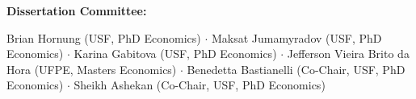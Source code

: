 \documentclass[mm, 10pt]{simple_style}
\begin{document}
\begin{resume}
\begin{minipage}[t]{0.75\textwidth}
\end{minipage}

\textbf{Dissertation Committee:} \\
\indent \hspace{1cm}  \begin{minipage}[t]{0.75\textwidth}
        Brian Hornung (USF, PhD Economics)
        $\cdot$ Maksat Jumamyradov (USF, PhD Economics)
        $\cdot$ Karina Gabitova (USF, PhD Economics)
        $\cdot$ Jefferson Vieira Brito da Hora (UFPE, Masters Economics) 
        $\cdot$ Benedetta Bastianelli (Co-Chair, USF, PhD Economics)
        $\cdot$ Sheikh Ashekan (Co-Chair, USF, PhD Economics)
        \end{minipage}        


\end{resume}
\end{document}
